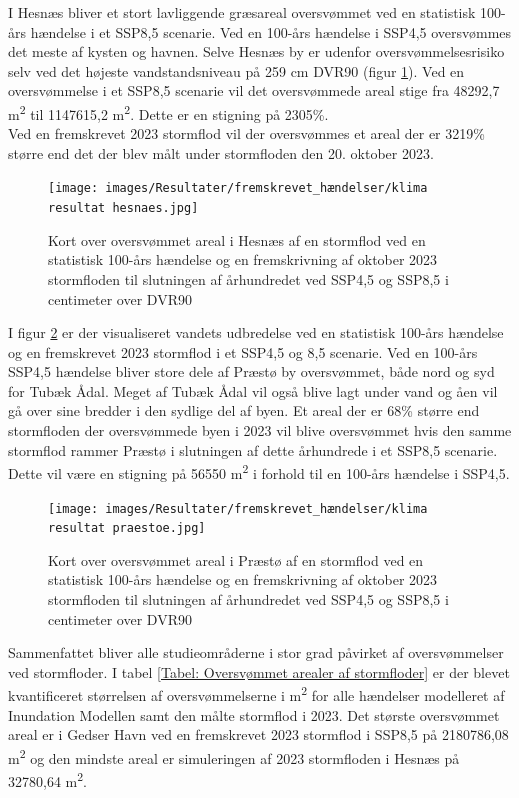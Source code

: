I Hesnæs bliver et stort lavliggende græsareal oversvømmet ved en statistisk 100-års hændelse i et SSP8,5 scenarie. Ved en 100-års hændelse i SSP4,5 oversvømmes det meste af kysten og havnen. Selve Hesnæs by er udenfor oversvømmelsesrisiko selv ved det højeste vandstandsniveau på 259 cm DVR90 (figur \ref{Figur: Klima Hesnæs}). Ved en oversvømmelse i et SSP8,5 scenarie vil det oversvømmede areal stige fra 48292,7 m\textsuperscript{2} til 1147615,2 m\textsuperscript{2}. Dette er en stigning på 2305\%. \\
Ved en fremskrevet 2023 stormflod vil der oversvømmes et areal der er 3219\% større end det der blev målt under stormfloden den 20. oktober 2023. 

\begin{figure}[H]
    \centering
    \texttt{[image: images/Resultater/fremskrevet\_hændelser/klima resultat hesnaes.jpg]}
    \caption{Kort over oversvømmet areal i Hesnæs af en stormflod ved en statistisk 100-års hændelse og en fremskrivning af oktober 2023 stormfloden til slutningen af århundredet ved SSP4,5 og SSP8,5 i centimeter over DVR90}
    \label{Figur: Klima Hesnæs}
\end{figure}

I figur \ref{Figur: Klima Præstø} er der visualiseret vandets udbredelse ved en statistisk 100-års hændelse og en fremskrevet 2023 stormflod i et SSP4,5 og 8,5 scenarie. Ved en 100-års SSP4,5 hændelse bliver store dele af Præstø by oversvømmet, både nord og syd for Tubæk Ådal. Meget af Tubæk Ådal vil også blive lagt under vand og åen vil gå over sine bredder i den sydlige del af byen. Et areal der er 68\% større end stormfloden der oversvømmede byen i 2023 vil blive oversvømmet hvis den samme stormflod rammer Præstø i slutningen af dette århundrede i et SSP8,5 scenarie. Dette vil være en stigning på 56550 m\textsuperscript{2} i forhold til en 100-års hændelse i SSP4,5.

\begin{figure}[H]
    \centering
    \texttt{[image: images/Resultater/fremskrevet\_hændelser/klima resultat praestoe.jpg]}
    \caption{Kort over oversvømmet areal i Præstø af en stormflod ved en statistisk 100-års hændelse og en fremskrivning af oktober 2023 stormfloden til slutningen af århundredet ved SSP4,5 og SSP8,5 i centimeter over DVR90}
    \label{Figur: Klima Præstø}
\end{figure}

Sammenfattet bliver alle studieområderne i stor grad påvirket af oversvømmelser ved stormfloder. I tabel \ref{Tabel: Oversvømmet arealer af stormfloder} er der blevet kvantificeret størrelsen af oversvømmelserne i m\textsuperscript{2} for alle hændelser modelleret af Inundation Modellen samt den målte stormflod i 2023. Det største oversvømmet areal er i Gedser Havn ved en fremskrevet 2023 stormflod i SSP8,5 på 2180786,08 m\textsuperscript{2} og den mindste areal er simuleringen af 2023 stormfloden i Hesnæs på 32780,64 m\textsuperscript{2}. \\

